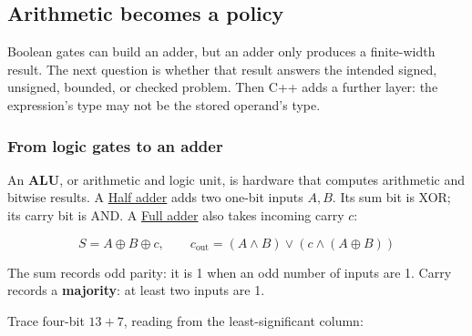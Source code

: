 \subsection{Arithmetic becomes a policy}\label{01-foundations-i-ch001-arithmetic-becomes-a-policy}

\hypertarget{01-foundations-i-ch001-arithmetic-becomes-a-policy}{}

Boolean gates can build an adder, but an adder only produces a finite-width result. The next question is whether that result answers the intended signed, unsigned, bounded, or checked problem. Then C++ adds a further layer: the expression's type may not be the stored operand's type.

\subsubsection{From logic gates to an adder}\label{01-foundations-i-ch001-from-logic-gates-to-an-adder}

\hypertarget{01-foundations-i-ch001-from-logic-gates-to-an-adder}{}

An \textbf{ALU}, or arithmetic and logic unit, is hardware that computes arithmetic and bitwise results. A \hyperref[appendix-1652d27a8e90]{Half adder} adds two one-bit inputs \(A,B\). Its sum bit is XOR; its carry bit is AND. A \hyperref[appendix-d1a5b1e520c2]{Full adder} also takes incoming carry \(c\):

\[
S=A\oplus B\oplus c,\qquad
c_{\mathrm{out}}=(A\land B)\lor(c\land(A\oplus B))
\]

The sum records odd parity: it is 1 when an odd number of inputs are 1. Carry records a \textbf{majority}: at least two inputs are 1.

Trace four-bit \(13+7\), reading from the least-significant column:

